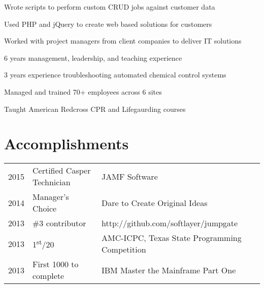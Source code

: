 \documentclass[letterpaper]{resume} %
\begin{document}
\begin{minipage}[t]{0.66\textwidth}
\sectionspace %



\begin{tightitemize}
\item Wrote scripts to perform custom CRUD jobs against customer data
\item Used PHP and jQuery to create web based solutions for customers
\item Worked with project managers from client companies to deliver IT solutions
\end{tightitemize}

\sectionspace %


\begin{tightitemize}
\item 6 years management, leadership, and teaching experience
\item 3 years experience troubleshooting automated chemical control systems
\item Managed and trained 70+ employees across 6 sites
\item Taught American Redcross CPR and Lifegaurding courses
\end{tightitemize}

\sectionspace %



\section{Accomplishments} 

\begin{tabular}{rll}
2015     & Certified Casper Technician & JAMF Software\\
2014	 & Manager's Choice & Dare to Create Original Ideas\\
2013  & \#3 contributor & http://github.com/softlayer/jumpgate \\
2013	 & 1\textsuperscript{st}/20 & AMC-ICPC, Texas State Programming Competition\\
2013	 & First 1000 to complete & IBM Master the Mainframe Part One\\
\end{tabular}


\end{minipage}
\end{document}
